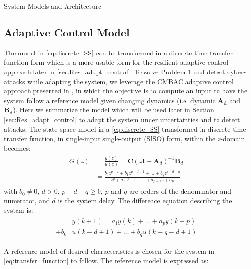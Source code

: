 \begin{section}{System Models and Architecture}
\subsection{Adaptive Control Model}
The model in \eqref{eq:discrete_SS} can be transformed in a discrete-time transfer function form which is a more usable form for the resilient adaptive control approach later in \ref{sec:Res_adapt_control}. To solve Problem 1 and detect cyber-attacks while adapting the system, we leverage the CMBAC adaptive control approach presented in \cite{4106038}, in which the objective is to compute an input to have the system follow a reference model given changing dynamics (i.e. dynamic $\bm{A_d}$ and  $\bm{B_d}$). Here we summarize the model which will be used later in Section \ref{sec:Res_adapt_control} to adapt the system under uncertainties and to detect attacks. The state space model in a \eqref{eq:discrete_SS} transformed in discrete-time transfer function, in single-input single-output (SISO) form, within the $z$-domain becomes:
	\begin{align}
	\begin{split}
	\label{eq:transfer_function}
        G(z) & = \frac{y(z)}{u(z)} = \bm{C}(z\bm{I}-\bm{A}_d)^{-1}\bm{B}_d  \\
	& = \frac{b_0z^{p-d}+b_1z^{p-d-1} +...+b_qz^{p-d-q}}{z^{p}+a_1z^{p-1}+...+a_{p-1}z+a_p} 
	\end{split}
	\end{align}
with $b_0\ne{0}$, $d>0$, $p-d-q\geq{0}$, $p$ and $q$ are orders of the denominator and numerator, and $d$ is the system delay. The difference equation describing the system is:
    \begin{align}
    \begin{split}
	\label{eq:difference_equation}
	&y(k+1)=a_1y(k)+\dots+a_py(k-p) \\
	+b_0&u(k-d+1)+\dots+b_qu(k-q-d+1)
	\end{split}
	\end{align}
	
A reference model of desired characteristics is chosen for the system in \eqref{eq:transfer_function} to follow. The reference model is expressed as:



\end{section}

